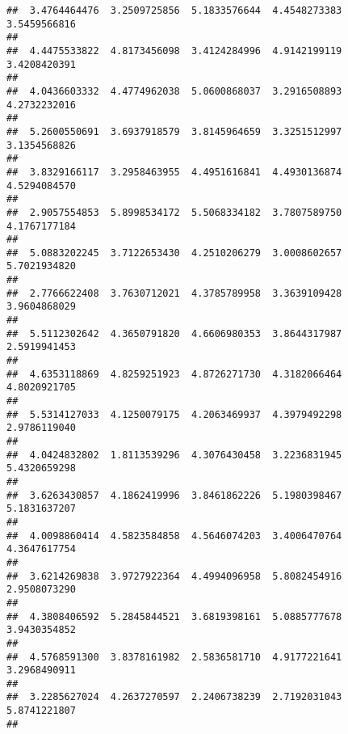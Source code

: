 \documentclass[]{article}
\begin{document}
\begin{verbatim}
##  3.4764464476  3.2509725856  5.1833576644  4.4548273383  3.5459566816 
##                                                                       
##  4.4475533822  4.8173456098  3.4124284996  4.9142199119  3.4208420391 
##                                                                       
##  4.0436603332  4.4774962038  5.0600868037  3.2916508893  4.2732232016 
##                                                                       
##  5.2600550691  3.6937918579  3.8145964659  3.3251512997  3.1354568826 
##                                                                       
##  3.8329166117  3.2958463955  4.4951616841  4.4930136874  4.5294084570 
##                                                                       
##  2.9057554853  5.8998534172  5.5068334182  3.7807589750  4.1767177184 
##                                                                       
##  5.0883202245  3.7122653430  4.2510206279  3.0008602657  5.7021934820 
##                                                                       
##  2.7766622408  3.7630712021  4.3785789958  3.3639109428  3.9604868029 
##                                                                       
##  5.5112302642  4.3650791820  4.6606980353  3.8644317987  2.5919941453 
##                                                                       
##  4.6353118869  4.8259251923  4.8726271730  4.3182066464  4.8020921705 
##                                                                       
##  5.5314127033  4.1250079175  4.2063469937  4.3979492298  2.9786119040 
##                                                                       
##  4.0424832802  1.8113539296  4.3076430458  3.2236831945  5.4320659298 
##                                                                       
##  3.6263430857  4.1862419996  3.8461862226  5.1980398467  5.1831637207 
##                                                                       
##  4.0098860414  4.5823584858  4.5646074203  3.4006470764  4.3647617754 
##                                                                       
##  3.6214269838  3.9727922364  4.4994096958  5.8082454916  2.9508073290 
##                                                                       
##  4.3808406592  5.2845844521  3.6819398161  5.0885777678  3.9430354852 
##                                                                       
##  4.5768591300  3.8378161982  2.5836581710  4.9177221641  3.2968490911 
##                                                                       
##  3.2285627024  4.2637270597  2.2406738239  2.7192031043  5.8741221807 
##                                                                       

\end{verbatim}
\end{document}
